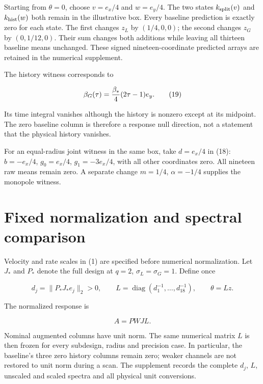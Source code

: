 \documentclass[aps,prd,preprint,onecolumn,notitlepage]{revtex4-2}
\begin{document}
Starting from \(\theta=0\), choose \(v=e_x/4\) and \(w=e_y/4\). The two states \(k_{\rm split}(v)\) and \(k_{\rm hist}(w)\) both remain in the illustrative box. Every baseline prediction is exactly zero for each state. The first changes \(z_L\) by \((1/4,0,0)\); the second changes \(z_G\) by \((0,1/12,0)\). Their sum changes both additions while leaving all thirteen baseline means unchanged. These signed nineteen-coordinate predicted arrays are retained in the numerical supplement.

The history witness corresponds to

\[
\beta_G(\tau)={\beta_*\over4}(2\tau-1)e_y.               \tag{19}
\]

Its time integral vanishes although the history is nonzero except at its midpoint. The zero baseline column is therefore a response null direction, not a statement that the physical history vanishes.

For an equal-radius joint witness in the same box, take \(d=e_x/4\) in (18): \(b=-e_x/4\), \(g_0=e_x/4\), \(g_1=-3e_x/4\), with all other coordinates zero. All nineteen raw means remain zero. A separate change \(m=1/4\), \(\alpha=-1/4\) supplies the monopole witness.

\hypertarget{fixed-normalization-and-spectral-comparison}{%
\section{Fixed normalization and spectral comparison}\label{fixed-normalization-and-spectral-comparison}}

Velocity and rate scales in (1) are specified before numerical normalization. Let \(J_*\) and \(P_*\) denote the full design at \(q=2\), \(\sigma_L=\sigma_G=1\). Define once

\[
d_j=\|P_*J_*e_j\|_2>0,\qquad
L=\operatorname{diag}(d_1^{-1},\ldots,d_{18}^{-1}),\qquad
\theta=Lz.                                             \tag{20}
\]

The normalized response is

\[
A=PWJL.                                                 \tag{21}
\]

Nominal augmented columns have unit norm. The same numerical matrix \(L\) is then frozen for every subdesign, radius and precision case. In particular, the baseline's three zero history columns remain zero; weaker channels are not restored to unit norm during a scan. The supplement records the complete \(d_j\), \(L\), unscaled and scaled spectra and all physical unit conversions.
\end{document}
